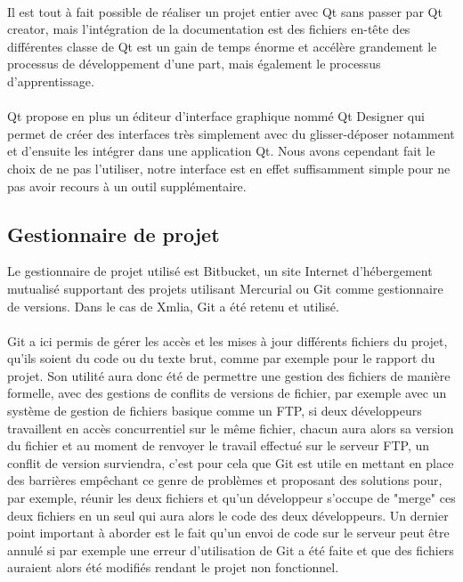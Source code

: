 \paragraph{}
Il est tout à fait possible de réaliser un projet entier avec Qt sans passer par Qt creator, mais l'intégration de la documentation est des fichiers en-tête des différentes classe de Qt est un gain de temps énorme et accélère grandement le processus de développement d'une part, mais également le processus d'apprentissage.
\paragraph{}
Qt propose en plus un éditeur d'interface graphique nommé Qt Designer qui permet de créer des interfaces très simplement avec du glisser-déposer notamment et d'ensuite les intégrer dans une application Qt. Nous avons cependant fait le choix de ne pas l'utiliser, notre interface est en effet suffisamment simple pour ne pas avoir recours à un outil supplémentaire.


\subsection{Gestionnaire de projet}
Le gestionnaire de projet utilisé est Bitbucket, un site Internet d'hébergement mutualisé supportant des projets utilisant Mercurial ou Git comme gestionnaire de versions. Dans le cas de Xmlia, Git a été retenu et utilisé.
\paragraph{}
Git a ici permis de gérer les accès et les mises à jour différents fichiers du projet, qu'ils soient du code ou du texte brut, comme par exemple pour le rapport du projet. Son utilité aura donc été de permettre une gestion des fichiers de manière formelle, avec des gestions de conflits de versions de fichier, par exemple avec un système de gestion de fichiers basique comme un FTP, si deux développeurs travaillent en accès concurrentiel sur le même fichier, chacun aura alors sa version du fichier et au moment de renvoyer le travail effectué sur le serveur FTP, un conflit de version surviendra, c'est pour cela que Git est utile en mettant en place des barrières empêchant ce genre de problèmes et proposant des solutions pour, par exemple, réunir les deux fichiers et qu'un développeur s'occupe de "merge" ces deux fichiers en un seul qui aura alors le code des deux développeurs. Un dernier point important à aborder est le fait qu'un envoi de code sur le serveur peut être annulé si par exemple une erreur d'utilisation de Git a été faite et que des fichiers auraient alors été modifiés rendant le projet non fonctionnel.
